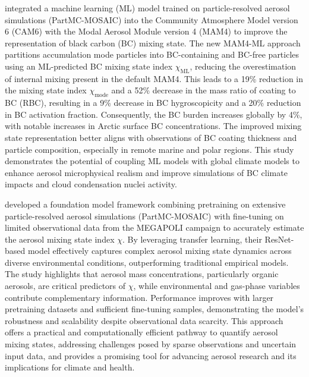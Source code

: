 \documentclass[11pt]{article}
\begin{document}
\citet{shen2024improving} integrated a machine learning (ML) model trained on particle-resolved aerosol simulations (PartMC-MOSAIC) into the Community Atmosphere Model version 6 (CAM6) with the Modal Aerosol Module version 4 (MAM4) to improve the representation of black carbon (BC) mixing state. The new MAM4-ML approach partitions accumulation mode particles into BC-containing and BC-free particles using an ML-predicted BC mixing state index \(\chi_{\mathrm{ML}}\), reducing the overestimation of internal mixing present in the default MAM4. This leads to a 19\% reduction in the mixing state index \(\chi_{\mathrm{mode}}\) and a 52\% decrease in the mass ratio of coating to BC (RBC), resulting in a 9\% decrease in BC hygroscopicity and a 20\% reduction in BC activation fraction. Consequently, the BC burden increases globally by 4\%, with notable increases in Arctic surface BC concentrations. The improved mixing state representation better aligns with observations of BC coating thickness and particle composition, especially in remote marine and polar regions. This study demonstrates the potential of coupling ML models with global climate models to enhance aerosol microphysical realism and improve simulations of BC climate impacts and cloud condensation nuclei activity.

\citet{jiang2025integrating} developed a foundation model framework combining pretraining on extensive particle-resolved aerosol simulations (PartMC-MOSAIC) with fine-tuning on limited observational data from the MEGAPOLI campaign to accurately estimate the aerosol mixing state index \(\chi\). By leveraging transfer learning, their ResNet-based model effectively captures complex aerosol mixing state dynamics across diverse environmental conditions, outperforming traditional empirical models. The study highlights that aerosol mass concentrations, particularly organic aerosols, are critical predictors of \(\chi\), while environmental and gas-phase variables contribute complementary information. Performance improves with larger pretraining datasets and sufficient fine-tuning samples, demonstrating the model’s robustness and scalability despite observational data scarcity. This approach offers a practical and computationally efficient pathway to quantify aerosol mixing states, addressing challenges posed by sparse observations and uncertain input data, and provides a promising tool for advancing aerosol research and its implications for climate and health.
\end{document}
